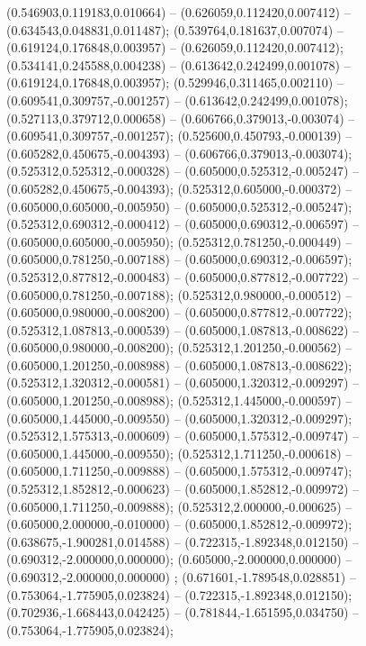 (0.546903,0.119183,0.010664) -- (0.626059,0.112420,0.007412) -- (0.634543,0.048831,0.011487);
 (0.539764,0.181637,0.007074) -- (0.619124,0.176848,0.003957) -- (0.626059,0.112420,0.007412);
 (0.534141,0.245588,0.004238) -- (0.613642,0.242499,0.001078) -- (0.619124,0.176848,0.003957);
 (0.529946,0.311465,0.002110) -- (0.609541,0.309757,-0.001257) -- (0.613642,0.242499,0.001078);
 (0.527113,0.379712,0.000658) -- (0.606766,0.379013,-0.003074) -- (0.609541,0.309757,-0.001257);
 (0.525600,0.450793,-0.000139) -- (0.605282,0.450675,-0.004393) -- (0.606766,0.379013,-0.003074);
 (0.525312,0.525312,-0.000328) -- (0.605000,0.525312,-0.005247) -- (0.605282,0.450675,-0.004393);
 (0.525312,0.605000,-0.000372) -- (0.605000,0.605000,-0.005950) -- (0.605000,0.525312,-0.005247);
 (0.525312,0.690312,-0.000412) -- (0.605000,0.690312,-0.006597) -- (0.605000,0.605000,-0.005950);
 (0.525312,0.781250,-0.000449) -- (0.605000,0.781250,-0.007188) -- (0.605000,0.690312,-0.006597);
 (0.525312,0.877812,-0.000483) -- (0.605000,0.877812,-0.007722) -- (0.605000,0.781250,-0.007188);
 (0.525312,0.980000,-0.000512) -- (0.605000,0.980000,-0.008200) -- (0.605000,0.877812,-0.007722);
 (0.525312,1.087813,-0.000539) -- (0.605000,1.087813,-0.008622) -- (0.605000,0.980000,-0.008200);
 (0.525312,1.201250,-0.000562) -- (0.605000,1.201250,-0.008988) -- (0.605000,1.087813,-0.008622);
 (0.525312,1.320312,-0.000581) -- (0.605000,1.320312,-0.009297) -- (0.605000,1.201250,-0.008988);
 (0.525312,1.445000,-0.000597) -- (0.605000,1.445000,-0.009550) -- (0.605000,1.320312,-0.009297);
 (0.525312,1.575313,-0.000609) -- (0.605000,1.575312,-0.009747) -- (0.605000,1.445000,-0.009550);
 (0.525312,1.711250,-0.000618) -- (0.605000,1.711250,-0.009888) -- (0.605000,1.575312,-0.009747);
 (0.525312,1.852812,-0.000623) -- (0.605000,1.852812,-0.009972) -- (0.605000,1.711250,-0.009888);
 (0.525312,2.000000,-0.000625) -- (0.605000,2.000000,-0.010000) -- (0.605000,1.852812,-0.009972);
 (0.638675,-1.900281,0.014588) -- (0.722315,-1.892348,0.012150) -- (0.690312,-2.000000,0.000000);
 (0.605000,-2.000000,0.000000) -- (0.690312,-2.000000,0.000000) ;
 (0.671601,-1.789548,0.028851) -- (0.753064,-1.775905,0.023824) -- (0.722315,-1.892348,0.012150);
 (0.702936,-1.668443,0.042425) -- (0.781844,-1.651595,0.034750) -- (0.753064,-1.775905,0.023824);
